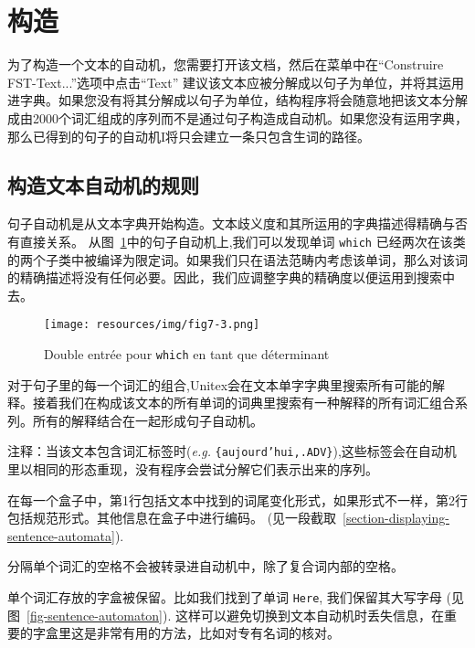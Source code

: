 \section{构造}
为了构造一个文本的自动机，您需要打开该文档，然后在菜单中在“Construire FST-Text...”选项中点击“Text”
 建议该文本应被分解成以句子为单位，并将其运用进字典。如果您没有将其分解成以句子为单位，结构程序将会随意地把该文本分解成由2000个词汇组成的序列而不是通过句子构造成自动机。如果您没有运用字典，那么已得到的句子的自动机I将只会建立一条只包含生词的路径。



\subsection{构造文本自动机的规则}
句子自动机是从文本字典开始构造。文本歧义度和其所运用的字典描述得精确与否有直接关系。
从图~\ref{fig-ambiguity-of-which}中的句子自动机上,我们可以发现单词
\verb+which+ 已经两次在该类的两个子类中被编译为限定词。如果我们只在语法范畴内考虑该单词，那么对该词的精确描述将没有任何必要。因此，我们应调整字典的精确度以便运用到搜索中去。 


\begin{figure}[!ht]
\begin{center}
\texttt{[image: resources/img/fig7-3.png]}
\caption{Double entrée pour \texttt{which} en tant que déterminant\label{fig-ambiguity-of-which}}
\end{center}
\end{figure}

\bigskip
\noindent 对于句子里的每一个词汇的组合,Unitex会在文本单字字典里搜索所有可能的解释。接着我们在构成该文本的所有单词的词典里搜索有一种解释的所有词汇组合系列。所有的解释结合在一起形成句子自动机。

\bigskip
\noindent 注释：当该文本包含词汇标签时(\textit{e.g.}
 \verb${aujourd’hui,.ADV}$),这些标签会在自动机里以相同的形态重现，没有程序会尝试分解它们表示出来的序列。 

\bigskip
\noindent 在每一个盒子中，第1行包括文本中找到的词尾变化形式，如果形式不一样，第2行包括规范形式。其他信息在盒子中进行编码。
 (见一段截取~\ref{section-displaying-sentence-automata}).

\bigskip
\noindent 分隔单个词汇的空格不会被转录进自动机中，除了复合词内部的空格。


\bigskip
\noindent 单个词汇存放的字盒被保留。比如我们找到了单词
\verb+Here+, 我们保留其大写字母 (见图~\ref{fig-sentence-automaton}). 这样可以避免切换到文本自动机时丢失信息，在重要的字盒里这是非常有用的方法，比如对专有名词的核对。


